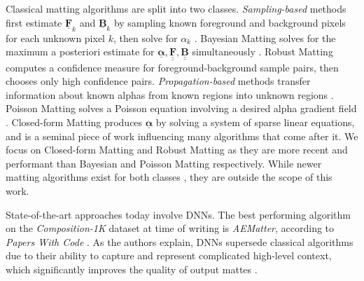\documentclass{article}
\theoremstyle{definition}
\def\vt#1{\underline{\mathbf{#1}}}
\def\vts#1{\underline{\boldsymbol{#1}}}
\def\mt#1{\underline{\underline{\mathbf{#1}}}}
\begin{document}
\begin{multicols}{2}[]
Classical matting algorithms are split into two classes. \emph{Sampling-based} methods first estimate $\vt F_k$ and $\vt B_k$ by sampling known foreground and background pixels for each unknown pixel $k$, then solve for $\alpha_k$ \cite{dim-paper}. Bayesian Matting solves for the maximum a posteriori estimate for $\vts \alpha,\mt F,\mt B$ simultaneously \cite{bayesian-matting}. Robust Matting computes a confidence measure for foreground-background sample pairs, then chooses only high confidence pairs. \emph{Propagation-based} methods transfer information about known alphas from known regions into unknown regions \cite{dim-paper}. Poisson Matting solves a Poisson equation involving a desired alpha gradient field \cite{poisson-matting}. Closed-form Matting produces $\vts \alpha$ by solving a system of sparse linear equations, and is a seminal piece of work influencing many algorithms that come after it. We focus on Closed-form Matting and Robust Matting as they are more recent and performant than Bayesian and Poisson Matting respectively. While newer matting algorithms exist for both classes \cite{closed-form-survey}, they are outside the scope of this work. %

State-of-the-art approaches today involve DNNs. The best performing algorithm on the \emph{Composition-1K} dataset at time of writing is \emph{AEMatter}, according to \emph{Papers With Code} \cite{web:papers-with-code}. As the authors explain, DNNs supersede classical algorithms due to their ability to capture and represent complicated high-level context, which significantly improves the quality of output mattes \cite{sota-composition-1k}.



\end{multicols}
\end{document}
